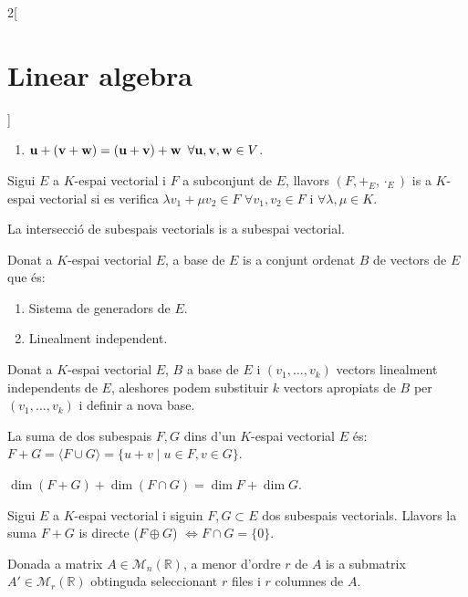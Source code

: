 \documentclass[../../../main.tex]{subfiles}
\begin{document}
\begin{multicols}{2}[\section{Linear algebra}]
\begin{definition}
\begin{enumerate}
        \item $\vb{u}+(\vb{v}+\vb{w})=(\vb{u}+\vb{v})+\vb{w}$ $\forall\vb{u},\vb{v},\vb{w}\in V$.
    \end{enumerate}
\end{definition}
\begin{definition}
Sigui $E$ a $K$-espai vectorial i $F$ a subconjunt de $E$, llavors $(F,+_E,\cdot_E)$ is a $K$-espai vectorial si es verifica $\lambda v_1+\mu v_2\in F$ $\forall v_1,v_2\in F$ i $\forall\lambda,\mu\in K$.
\end{definition}
\begin{lemma}
La intersecció de subespais vectorials is a subespai vectorial.
\end{lemma}
\begin{definition}
Donat a $K$-espai vectorial $E$, a base de $E$ is a conjunt ordenat $B$ de vectors de $E$ que és: 
\begin{enumerate}
    \item Sistema de generadors de $E$.
    \item Linealment independent.
\end{enumerate}
\end{definition}
\begin{theorem}
Donat a $K$-espai vectorial $E$, $B$ a base de $E$ i $(v_1,\ldots,v_k)$ vectors linealment independents de $E$, aleshores podem substituir $k$ vectors apropiats de $B$ per $(v_1,\ldots,v_k)$ i definir a nova base.
\end{theorem}
\begin{definition}
La suma de dos subespais $F,G$ dins d'un $K$-espai vectorial $E$ és: $F+G=\langle F\cup G\rangle=\{u+v\mid u\in F,v\in G\}$.
\end{definition}
\begin{prop}
$\dim (F+G)+\dim(F\cap G)=\dim F+\dim G$.
\end{prop}
\begin{definition}
Sigui $E$ a $K$-espai vectorial i siguin $F,G\subset E$ dos subespais vectorials. Llavors la suma $F+G$ is directe ($F\oplus G$) $\iff F\cap G=\{0\}$.
\end{definition}
\begin{definition}
Donada a matrix $A\in\mathcal{M}_n(\mathbb{R})$, a menor d'ordre $r$ de $A$ is a submatrix $A'\in\mathcal{M}_r(\mathbb{R})$ obtinguda seleccionant $r$ files i $r$ columnes de $A$.
\end{definition}

\end{multicols}
\end{document}
